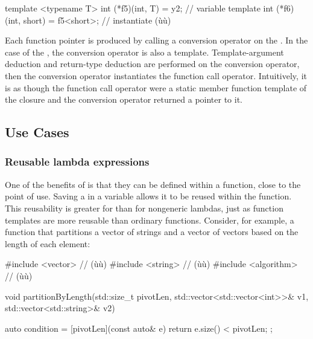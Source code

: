 {\begin{emcppslisting}
template <typename T> int (*f5)(int, T) = y2;  // variable template
int (*f6)(int, short) = f5<short>;             // instantiate (ù{}ù)
\end{emcppslisting}
    

\noindent Each function pointer is produced by calling a conversion operator on
the . In the case of the ,
the conversion operator is also a template. Template-argument deduction
and return-type deduction are performed on the conversion operator, then
the conversion operator instantiates the function call operator.
Intuitively, it is as though the function call operator were a static
member function template of the closure and the conversion operator
returned a pointer to it.

\subsection[Use Cases]{Use Cases}\label{use-cases}

\subsubsection[Reusable lambda expressions]{Reusable lambda expressions}\label{reusable-lambda-expressions}

One of the benefits of  is that they can be
defined within a function, close to the point of use. Saving a
 in a variable allows it to be reused within
the function. This reusability is greater for 
than for nongeneric lambdas, just as function templates are more
reusable than ordinary functions. Consider, for example, a function that
partitions a vector of strings and a vector of vectors based on the
length of each element:

\begin{emcppslisting}
#include <vector>     // (ù{}ù)
#include <string>     // (ù{}ù)
#include <algorithm>  // (ù{}ù)

void partitionByLength(std::size_t                    pivotLen,
                       std::vector<std::vector<int>>& v1,
                       std::vector<std::string>&      v2)
{
    auto condition = [pivotLen](const auto& e) { return e.size() < pivotLen; };

}
\end{emcppslisting}}
